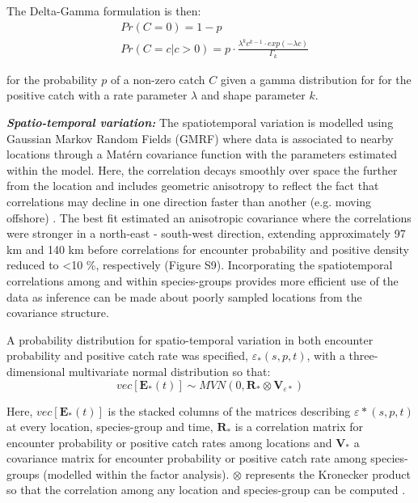 \documentclass{nature}
\begin{document}
The Delta-Gamma formulation is then:
\begin{equation}
	\begin{split}
	& Pr(C = 0) = 1 - p \\
	& Pr(C = c | c > 0) = p \cdot \frac{\lambda^{k}c^{k-1} \cdot exp(-\lambda c)}{\Gamma_{k}}
	\end{split}
\end{equation}

for the probability $p$ of a non-zero catch $C$ given a gamma distribution for
for the positive catch with a rate parameter $\lambda$ and shape parameter $k$.

\textbf{\textit{Spatio-temporal variation:}} The spatiotemporal variation is
modelled using Gaussian Markov Random Fields (GMRF) where data is associated to
nearby locations through a Matérn covariance function with the parameters
estimated within the model. Here, the correlation decays smoothly over space
the further from the location and includes geometric anisotropy to reflect the
fact that correlations may decline in one direction faster than another (e.g.
moving offshore) \cite{Thorson2013}.  The best fit estimated an anisotropic
covariance where the correlations were stronger in a north-east - south-west
direction, extending approximately 97 km and 140 km before correlations for
encounter probability and positive density reduced to \textless 10 \%,
respectively (Figure S9).  Incorporating the spatiotemporal correlations among
and within species-groups provides more efficient use of the data as inference
can be made about poorly sampled locations from the covariance structure.

A probability distribution for spatio-temporal variation in both encounter
probability and positive catch rate was specified, $\varepsilon_{*}(s,p,t)$,
with a three-dimensional multivariate normal distribution so that:
	\begin{equation}
		vec[\mathbf{E}_{*}(t)] \sim MVN(0,\mathbf{R}_{*} \otimes
		\mathbf{V}_{{\varepsilon}{*}})
	\end{equation}

Here, $vec[\mathbf{E}_{*}(t)]$ is the stacked columns of the matrices
describing $\varepsilon{*}(s,p,t)$ at every location, species-group and time,
$\mathbf{R}_{*}$ is a correlation matrix for encounter probability or positive
catch rates among locations and $\mathbf{V}_{*}$ a covariance matrix for
encounter probability or positive catch rate among species-groups (modelled
within the factor analysis). $\otimes$ represents the Kronecker product so that
the correlation among any location and species-group can be computed
\cite{Thorson2017}.
		
\end{document}
